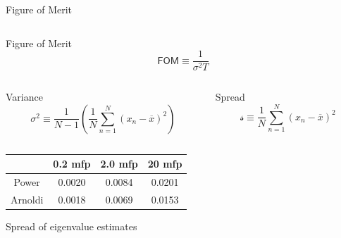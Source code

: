 \documentclass[xcolor={usenames, dvipsnames},]{beamer}
\begin{document}
\begin{frame}{Figure of Merit}
    \begin{columns}
    \begin{column}{0.45\textwidth}
    \begin{block}{Figure of Merit}
        \begin{equation*}
            \mathsf{FOM} \equiv \frac{1}{\sigma^2 T}
        \end{equation*}
    \end{block}
    \end{column}
    \end{columns}

    \pause
    \begin{columns}[m]
        \begin{column}{0.45\textwidth}
        \begin{block}{Variance}
            \begin{equation*}
                \sigma^2 \equiv \frac{1}{N-1}\left(\frac{1}{N}\sum_{n=1}^N \left(x_n - \overline{x}\right)^2\right)
            \end{equation*}
        \end{block}
        \end{column}

        \begin{column}{0.45\textwidth}
        \begin{block}{Spread}
            \begin{equation*}
                \mathscr{s} \equiv \frac{1}{N}\sum_{n=1}^N \left(x_n - \overline{x}\right)^2
            \end{equation*}
        \end{block}
        \end{column}
    \end{columns}

        
    \pause
    \begin{table}[h]
        \centering
        \begin{tabular}{cccc}
            \toprule
            & 0.2 mfp & 2.0 mfp & 20 mfp \\
            \midrule
            Power    & 0.0020 & 0.0084 & 0.0201 \\
            Arnoldi  & 0.0018 & 0.0069 & 0.0153 \\
            \bottomrule
        \end{tabular}
    \end{table}
    \begin{center} Spread of eigenvalue estimates \end{center}
\end{frame}
\end{document}
